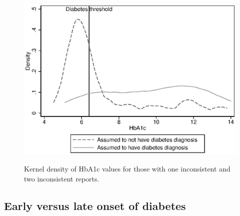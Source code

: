 \documentclass[12pt,english]{article}
\begin{document}
\begin{figure}[h!]
	\caption{\label{fig:kdens_inconsistency_hba1c}Kernel density of HbA1c values for those with one inconsistent and two inconsistent reports.}%
	\begin{center}
		\includegraphics[width=.7\linewidth]{figures/kdensity_hba1c_inconsist.eps}\\
	\end{center}
\end{figure}


\clearpage

\subsection*{Early versus late onset of diabetes}
\end{document}
